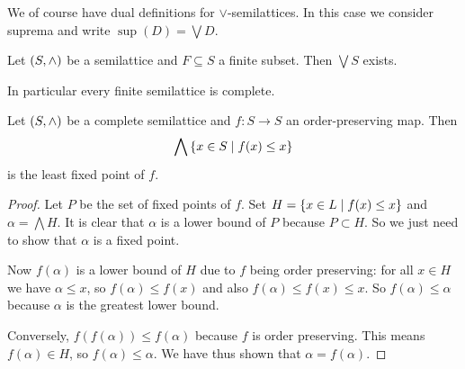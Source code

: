 We of course have dual definitions for $\vee$-semilattices. In this case we consider suprema and write $\sup(D) = \bigvee D$.

\begin{lemma} \label{supInfFiniteSubsetsLattice}
Let $\left( S,\wedge \right)$ be a semilattice and $F\subseteq S$ a finite subset. Then $\bigvee S$ exists. 
\end{lemma}
In particular every finite semilattice is complete.


\begin{theorem} \label{KnasterTarskiSemilattice}
Let $\left( S,\wedge \right)$ be a complete semilattice and $f:S\to S$ an order-preserving map. Then 
\[ \bigwedge \left\{ x\in S \;\middle|\; f(x) \leq x \right\} \]
is the least fixed point of $f$.
\end{theorem}
\begin{proof}
Let $P$ be the set of fixed points of $f$. Set $H = \left\{ x\in L \;\middle|\; f(x)\leq x \right\}$ and $\alpha = \bigwedge H$. It is clear that $\alpha$ is a lower bound of $P$ because $P \subset H$. So we just need to show that $\alpha$ is a fixed point.

Now $f(\alpha)$ is a lower bound of $H$ due to $f$ being order preserving: for all $x\in H$ we have $\alpha\leq x$, so $f(\alpha) \leq f(x)$ and also $f(\alpha) \leq f(x) \leq x$. So $f(\alpha)\leq \alpha$ because $\alpha$ is the greatest lower bound.

Conversely, $f(f(\alpha)) \leq f(\alpha)$ because $f$ is order preserving. This means $f(\alpha)\in H$, so $f(\alpha)\leq \alpha$. We have thus shown that $\alpha = f(\alpha)$.
\end{proof}

